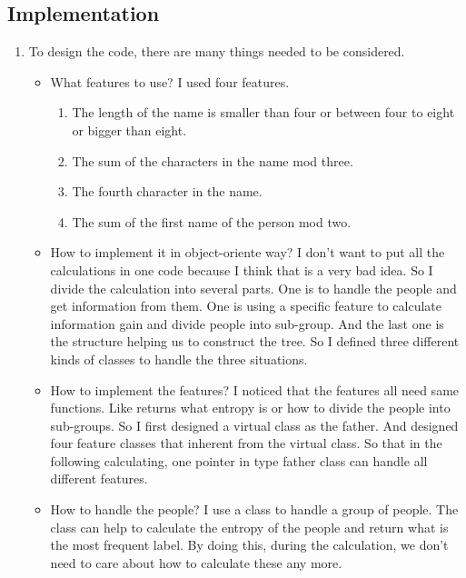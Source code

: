 \documentclass{article}[12pt]
\begin{document}
		\subsection{Implementation}
		\begin{enumerate}
			\item To design the code, there are many things needed to be considered.
			\begin{itemize}
				\item What features to use? \newline
					I used four features.
					\begin{enumerate}
						\item The length of the name is smaller than four or between four to eight or bigger than eight.
						\item The sum of the characters in the name mod three.
						\item The fourth character in the name.
						\item The sum of the first name of the person mod two.
					\end{enumerate}
				\item How to implement it in object-oriente way? \newline
					I don't want to put all the calculations in one code because I think that is a very bad idea. So I divide the calculation into several parts. One is to handle the people and get information from them. One is using a specific feature to calculate information gain and divide people into sub-group. And the last one is the structure helping us to construct the tree. So I defined three different kinds of classes to handle the three situations.
				\item How to implement the features? \newline
					I noticed that the features all need same functions. Like returns what entropy is or how to divide the people into sub-groups. So I first designed a virtual class as the father. And designed four feature classes that inherent from the virtual class. So that in the following calculating, one pointer in type father class can handle all different features.
				\item How to handle the people? \newline
					I use a class to handle a group of people. The class can help to calculate the entropy of the people and return what is the most frequent label. By doing this, during the calculation, we don't need to care about how to calculate these any more.
			\end{itemize}

\end{enumerate}
\end{document}
